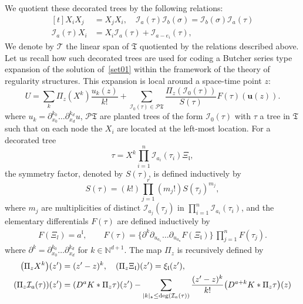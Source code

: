 \documentclass[AHL,Unicode,longabstracts]{cedram}
\newcommand{\bu}{\mathbf{u}}
\newcommand*\CT{\mathcal{T}}
\newcommand*\I{\mathcal{I}}
\newcommand*\CI{\I}
\newcommand*\CP{\mathcal{P}}
\newcommand{\mfl}{\mathfrak{l}}
\newcommand*\s{\mathfrak{s}}
\newcommand*\fkT{\mathfrak{T}}
\newcommand{\bbN}{\mathbb{N}}
\let\originalleft\left
\let\originalright\right
\renewcommand{\left}{\mathopen{}\mathclose\bgroup\originalleft}
\renewcommand{\right}{\aftergroup\egroup\originalright}
\begin{document}
We quotient these decorated trees by the following relations:
\begin{equation}\label{relation_trees}
\begin{aligned}[t]
X_i X_j & = X_j X_i, \quad \I_a(\tau) \I_{b}(\sigma) =\I_{b}(\sigma) \I_a(\tau)\\
\I_a(\tau)X_i & = X_i \I_a(\tau) + \I_{a-e_i}(\tau),
\end{aligned}
\end{equation}
We denote by $ \CT $ the linear span of $ \fkT $ quotiented by the relations described above. Let us recall how such decorated trees are used for coding a Butcher series type expansion of the solution of~\eqref{set01} within the framework of the theory of regularity structures. This expansion is local around a space-time point $ z $:
\begin{equation*}
U = \sum_{k} \Pi_z(X^k) \frac{u_{k}(z)}{k!} + \sum_{\CI_0(\tau) \in \CP\fkT} \frac{\Pi_z(\CI_{0}(\tau))}{S(\tau)} F(\tau)(\bu(z)).
\end{equation*}
where $ u_k =\partial_{x_0}^{k_0}\dots \partial_{x_d}^{k_d} u $, $ \CP\fkT $ are planted trees of the form $ \CI_0(\tau) $ with $ \tau $ a tree in $ \fkT $ such that on each node the $ X_i $ are located at the left-most location. For a decorated tree
\begin{equation*}
\tau = X^k \prod_{i=1}^n \CI_{a_i}(\tau_i) \Xi_{\mfl},
\end{equation*}
the symmetry factor, denoted by $ S(\tau) $, is defined inductively by
\begin{equation}\label{symmetry_factor}
S(\tau) = (k!) \prod_{j=1}^{r} (m_j !) S(\tau_j)^{m_j},
\end{equation}
where $m_j$ are multiplicities of distinct $\CI_{a_j}(\tau_j)$ in $\prod_{i=1}^n \CI_{a_i}(\tau_i)$, and the elementary differentials $ F(\tau) $ are defined inductively by
\begin{equation}\label{def_upsilon}
\begin{aligned}
F(\Xi_l) = a^{\mfl}, \qquad F(\tau) = \Big\{\partial^k \partial_{u_{a_1}}\dots \partial_{u_{a_n}} F (\Xi_{\mfl})\Big\}\,\prod_{j=1}^n F(\tau_j).
\end{aligned}
\end{equation}
where $ \partial^k = \partial_{x_0}^{k_0}\dots \partial_{x_d}^{k_d} $ for $ k \in \bbN^{d+1}$. The map $ \Pi_z $ is recursively defined by
\begin{equation}\label{def_Pi}
\begin{aligned}[t]
\left(\Pi_z X^k\right)(z') & = (z'-z)^k, \quad (\Pi_z \Xi_{\mfl})(z') = \xi_{\mfl}(z'),\\
\left(\Pi_z \CI_{a}(\tau)\right)(z') & = \left(D^{a} K * \Pi_z \tau\right)(z') - \sum_{|k|_{\s} \leq \deg(\CI_{a}(\tau))} \frac{(z'-z)^k}{k!} \left(D^{a +k} K * \Pi_z \tau\right)(z)
\end{aligned}
\end{equation}
\end{document}
